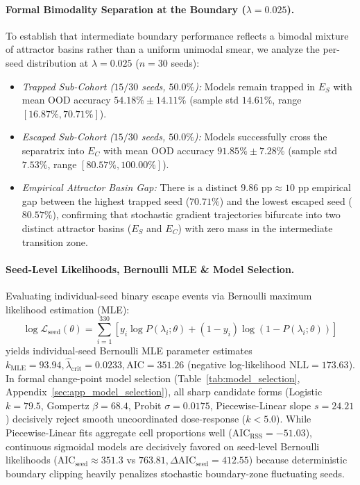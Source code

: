 \documentclass{article}
\theoremstyle{plain}
\theoremstyle{definition}
\begin{document}
\paragraph{Formal Bimodality Separation at the Boundary ($\lambda = 0.025$).}
\label{sec:bimodality_separation}
To establish that intermediate boundary performance reflects a bimodal mixture of attractor basins rather than a uniform unimodal smear, we analyze the per-seed distribution at $\lambda = 0.025$ ($n=30$ seeds):
\begin{itemize}[leftmargin=*,noitemsep]
    \item \emph{Trapped Sub-Cohort ($15/30$ seeds, $50.0\%$):} Models remain trapped in $E_S$ with mean OOD accuracy $54.18\% \pm 14.11\%$ (sample std $14.61\%$, range $[16.87\%, 70.71\%]$).
    \item \emph{Escaped Sub-Cohort ($15/30$ seeds, $50.0\%$):} Models successfully cross the separatrix into $E_C$ with mean OOD accuracy $91.85\% \pm 7.28\%$ (sample std $7.53\%$, range $[80.57\%, 100.00\%]$).
    \item \emph{Empirical Attractor Basin Gap:} There is a distinct $9.86\text{ pp} \approx 10\text{ pp}$ empirical gap between the highest trapped seed ($70.71\%$) and the lowest escaped seed ($80.57\%$), confirming that stochastic gradient trajectories bifurcate into two distinct attractor basins ($E_S$ and $E_C$) with zero mass in the intermediate transition zone.
\end{itemize}

\paragraph{Seed-Level Likelihoods, Bernoulli MLE \& Model Selection.}
Evaluating individual-seed binary escape events via Bernoulli maximum likelihood estimation (MLE):
\begin{equation}
    \log \mathcal{L}_{\text{seed}}(\theta) = \sum_{i=1}^{330} \left[ y_i \log P(\lambda_i; \theta) + (1 - y_i) \log (1 - P(\lambda_i; \theta)) \right]
    \label{eq:seed_log_likelihood}
\end{equation}
yields individual-seed Bernoulli MLE parameter estimates $k_{\text{MLE}} = 93.94, \hat{\lambda}_{\text{crit}} = 0.0233, \text{AIC} = 351.26$ (negative log-likelihood $\text{NLL} = 173.63$). In formal change-point model selection (Table~\ref{tab:model_selection}, Appendix~\ref{sec:app_model_selection}), all sharp candidate forms (Logistic $k=79.5$, Gompertz $\beta=68.4$, Probit $\sigma=0.0175$, Piecewise-Linear slope $s=24.21$) decisively reject smooth uncoordinated dose-response ($k < 5.0$). While Piecewise-Linear fits aggregate cell proportions well ($\text{AIC}_{\text{RSS}} = -51.03$), continuous sigmoidal models are decisively favored on seed-level Bernoulli likelihoods ($\text{AIC}_{\text{seed}} \approx 351.3$ vs $763.81, \Delta\text{AIC}_{\text{seed}} = 412.55$) because deterministic boundary clipping heavily penalizes stochastic boundary-zone fluctuating seeds.
\end{document}
